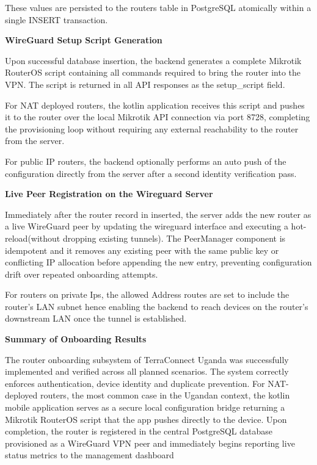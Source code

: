 \documentclass[12pt,a4paper,oneside]{report}
\begin{document}
These values are persisted to the routers table in PostgreSQL atomically within a single INSERT transaction.




\textbf{WireGuard Setup Script Generation}


Upon successful database insertion, the backend generates a complete Mikrotik RouterOS script containing all commands required to bring the router into the VPN. The script is returned in all API responses as the setup\_script field.


For NAT deployed routers, the kotlin application receives this script and pushes it to the router over the local Mikrotik API connection via port 8728, completing the provisioning loop without requiring any external reachability to the router from the server. 


For public IP routers, the backend optionally performs an auto push of the configuration directly from the server after a second identity verification pass.




\textbf{Live Peer Registration on the Wireguard Server}


Immediately after the router record in inserted, the server adds the new router as a live WireGuard peer by updating the wireguard interface and executing a hot-reload(without dropping existing tunnels). The PeerManager component is idempotent and it removes any existing peer with the same public key or conflicting IP allocation before appending the new entry, preventing configuration drift over repeated onboarding attempts.


For routers on private Ips, the allowed Address routes are set to include the router's LAN subnet hence enabling the backend to reach devices on the router's downstream LAN once the tunnel is established.




\textbf{Summary of Onboarding Results}


The router onboarding subsystem of TerraConnect Uganda was successfully implemented and verified across all planned scenarios. The system correctly enforces authentication, device identity and duplicate prevention. For NAT-deployed routers, the most common case in the Ugandan context, the kotlin mobile application serves as a secure local configuration bridge returning a Mikrotik RouterOS script that the app pushes directly to the device. Upon completion, the router is registered in the central PostgreSQL database provisioned as a WireGuard VPN peer and immediately begins reporting live status metrics to the management dashboard
\end{document}
